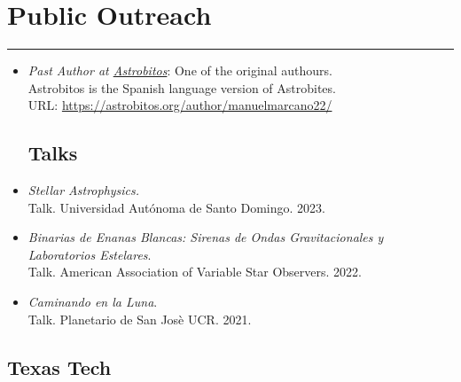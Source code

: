 \documentclass[letterpaper,10pt]{article}
\begin{document}
\section*{Public Outreach}
\hrule
\vspace{.3 cm}
\begin{itemize}[label=$\blacktriangleright$]

\item \emph{Past Author at \href{https://astrobitos.org/}{Astrobitos}}: One of the original authours. \\ Astrobitos is the Spanish language version of Astrobites.\\ URL: \url{https://astrobitos.org/author/manuelmarcano22/}


\subsection*{Talks}


\item \textit{Stellar Astrophysics.} \\
Talk. Universidad Aut\'onoma de Santo Domingo. 2023.


\item \textit{Binarias de Enanas Blancas: Sirenas de Ondas Gravitacionales y Laboratorios Estelares}. \\
Talk. American Association of Variable Star Observers. 2022.




\item \textit{Caminando en la Luna}. \\
Talk. Planetario de San Jos\`e UCR. 2021.
\end{itemize}









\subsection*{Texas Tech}
\end{document}
